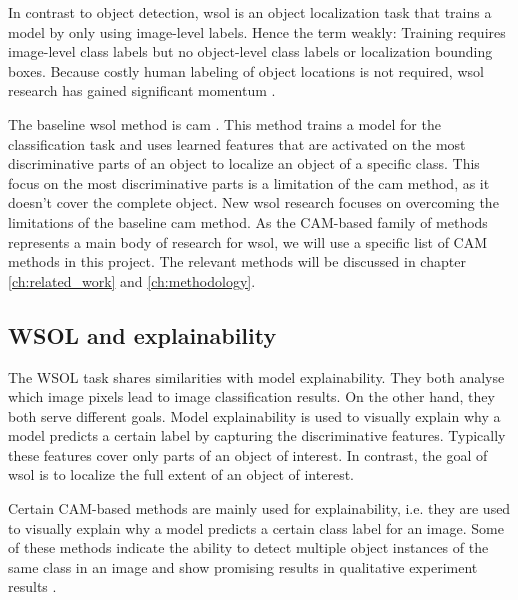In contrast to object detection, \acrshort{wsol} is an object localization task that trains a model by only using image-level labels. Hence the term weakly: Training requires image-level class labels but no object-level class labels or localization bounding boxes. Because costly human labeling of object locations is not required, \acrshort{wsol} research has gained significant momentum \cite{zhou2016cvpr, selvaraju2017grad, chattopadhay2018grad, wang2021minmaxcam, wang2020score, choe2020evaluating}.

The baseline \acrshort{wsol} method is \acrfull{cam} \cite{zhou2016cvpr}. This method trains a model for the classification task and uses learned features that are activated on the most discriminative parts of an object to localize an object of a specific class. This focus on the most discriminative parts is a limitation of the \acrshort{cam} method, as it doesn't cover the complete object. New \acrshort{wsol} research \cite{selvaraju2017grad, chattopadhay2018grad, wang2021minmaxcam, wang2020score, choe2020evaluating} focuses on overcoming the limitations of the baseline \acrshort{cam} method. As the CAM-based family of methods represents a main body of research for \acrlong{wsol}, we will use a specific list of CAM methods in this project. The relevant methods will be discussed in chapter \ref{ch:related_work} and \ref{ch:methodology}. 

\subsection{WSOL and explainability}
The WSOL task shares similarities with model explainability. They both analyse which image pixels lead to image classification results. On the other hand, they both serve different goals.
Model explainability is used to visually explain why a model predicts a certain label by capturing the discriminative features. Typically these features cover only parts of an object of interest. In contrast, the goal of \acrshort{wsol} is to localize the full extent of an object of interest.

Certain CAM-based methods are mainly used for explainability, i.e. they are used to visually explain why a model predicts a certain class label for an image. Some of these methods indicate the ability to detect multiple object instances of the same class in an image and show promising results in qualitative experiment results \cite{wang2020score}.

